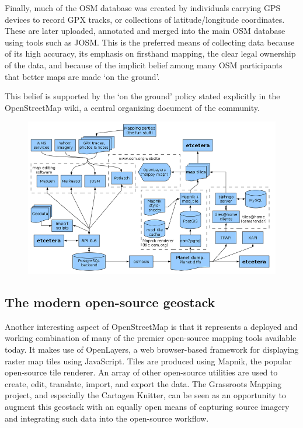 \documentclass[11pt,oneside,notitlepage]{report}
\begin{document}
Finally, much of the OSM database was created by individuals carrying GPS devices to record GPX tracks, or collections of latitude/longitude coordinates. These are later uploaded, annotated and merged into the main OSM database using tools such as JOSM. This is the preferred means of collecting data because of its high accuracy, its emphasis on firsthand mapping, the clear legal ownership of the data, and because of the implicit belief among many OSM participants that better maps are made `on the ground'. 

This belief is supported by the `on the ground' policy stated explicitly in the OpenStreetMap wiki, a central organizing document of the community.

\begin{figure}[h]
  \begin{center}
    \includegraphics[scale=0.45]{images/osm-diagram.png}
  \end{center}
\end{figure}

\subsection{The modern open-source geostack}

Another interesting aspect of OpenStreetMap is that it represents a deployed and working combination of many of the premier open-source mapping tools available today. It makes use of OpenLayers, a web browser-based framework for displaying raster map tiles using JavaScript. Tiles are produced using Mapnik, the popular open-source tile renderer. An array of other open-source utilities are used to create, edit, translate, import, and export the data. The Grassroots Mapping project, and especially the Cartagen Knitter, can be seen as an opportunity to augment this geostack with an equally open means of capturing source imagery and integrating such data into the open-source workflow. 
\end{document}
